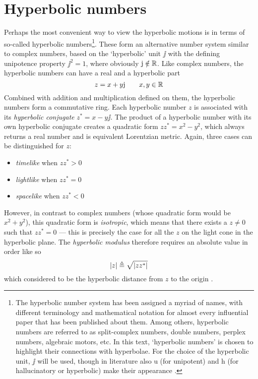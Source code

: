 \section{Hyperbolic numbers}
Perhaps the most convenient way to view the hyperbolic motions is in terms of so-called hyperbolic numbers\footnote{The hyperbolic number system has been assigned a myriad of names, with different terminology and mathematical notation for almost every influential paper that has been published about them. Among others, hyperbolic numbers are referred to as split-complex numbers, double numbers, perplex numbers, algebraic motors, etc. In this text, `hyperbolic numbers' is chosen to highlight their connections with hyperbolae. For the choice of the hyperbolic unit, \(\jj\) will be used, though in literature also \(\mathrm{u}\) (for unipotent) and \(\mathrm{h}\) (for hallucinatory or hyperbolic) make their appearance \cite{Fjelstad1986, Sobczyk1995, Motter1998, Harkin2004}.}. These form an alternative number system similar to complex numbers, based on the `hyperbolic' unit \(\jj\) with the defining unipotence property \(\jj^2 = 1\), where obviously \(\mathrm{j} \notin \mathbb{R}\). Like complex numbers, the hyperbolic numbers can have a real and a hyperbolic part
\[
     z = x + y\mathrm{j} \qquad x, y \in \mathbb{R}
\]
Combined with addition and multiplication defined on them, the hyperbolic numbers form a commutative ring. Each hyperbolic number \(z\) is associated with its \emph{hyperbolic conjugate} \(z^* = x - y\jj\). The product of a hyperbolic number with its own hyperbolic conjugate creates a quadratic form \(zz^* = x^2 - y^2\), which always returns a real number and is equivalent Lorentzian metric. Again, three cases can be distinguished for \(z\):
\begin{itemize}
    \item \emph{timelike} when \(zz^* > 0\)
    \item \emph{lightlike} when \(zz^* = 0\)
    \item \emph{spacelike} when \(zz^* < 0\)
\end{itemize}
However, in contrast to complex numbers (whose quadratic form would be \(x^2 + y^2\)), this quadratic form is \emph{isotropic}, which means that there exists a \(z \neq 0\) such that \(zz^* = 0\) --- this is precisely the case for all the \(z\) on the light cone in the hyperbolic plane. The \emph{hyperbolic modulus} therefore requires an absolute value in order like so
\[
     \abs{z} \triangleq \sqrt{\abs{zz^*}}
\]
which considered to be the hyperbolic distance from \(z\) to the origin \cite{Sobczyk1995}.

